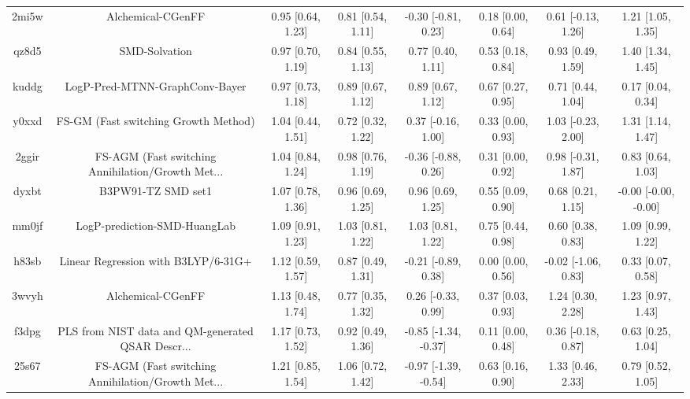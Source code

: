\documentclass{article}
\begin{document}
\begin{center}
\begin{longtable}{|cccccccc|}
 2mi5w &                                  Alchemical-CGenFF &  0.95 [0.64, 1.23] &  0.81 [0.54, 1.11] &   -0.30 [-0.81, 0.23] &  0.18 [0.00, 0.64] &   0.61 [-0.13, 1.26] &     1.21 [1.05, 1.35] \\
 qz8d5 &                                      SMD-Solvation &  0.97 [0.70, 1.19] &  0.84 [0.55, 1.13] &     0.77 [0.40, 1.11] &  0.53 [0.18, 0.84] &    0.93 [0.49, 1.59] &     1.40 [1.34, 1.45] \\
 kuddg &                     LogP-Pred-MTNN-GraphConv-Bayer &  0.97 [0.73, 1.18] &  0.89 [0.67, 1.12] &     0.89 [0.67, 1.12] &  0.67 [0.27, 0.95] &    0.71 [0.44, 1.04] &     0.17 [0.04, 0.34] \\
 y0xxd &               FS-GM (Fast switching Growth Method) &  1.04 [0.44, 1.51] &  0.72 [0.32, 1.22] &    0.37 [-0.16, 1.00] &  0.33 [0.00, 0.93] &   1.03 [-0.23, 2.00] &     1.31 [1.14, 1.47] \\
 2ggir &  FS-AGM (Fast switching Annihilation/Growth Met... &  1.04 [0.84, 1.24] &  0.98 [0.76, 1.19] &   -0.36 [-0.88, 0.26] &  0.31 [0.00, 0.92] &   0.98 [-0.31, 1.87] &     0.83 [0.64, 1.03] \\
 dyxbt &                                 B3PW91-TZ SMD set1 &  1.07 [0.78, 1.36] &  0.96 [0.69, 1.25] &     0.96 [0.69, 1.25] &  0.55 [0.09, 0.90] &    0.68 [0.21, 1.15] &  -0.00 [-0.00, -0.00] \\
 mm0jf &                       LogP-prediction-SMD-HuangLab &  1.09 [0.91, 1.23] &  1.03 [0.81, 1.22] &     1.03 [0.81, 1.22] &  0.75 [0.44, 0.98] &    0.60 [0.38, 0.83] &     1.09 [0.99, 1.22] \\
 h83sb &                Linear Regression with B3LYP/6-31G+ &  1.12 [0.59, 1.57] &  0.87 [0.49, 1.31] &   -0.21 [-0.89, 0.38] &  0.00 [0.00, 0.56] &  -0.02 [-1.06, 0.83] &     0.33 [0.07, 0.58] \\
 3wvyh &                                  Alchemical-CGenFF &  1.13 [0.48, 1.74] &  0.77 [0.35, 1.32] &    0.26 [-0.33, 0.99] &  0.37 [0.03, 0.93] &    1.24 [0.30, 2.28] &     1.23 [0.97, 1.43] \\
 f3dpg &  PLS from NIST data and QM-generated QSAR Descr... &  1.17 [0.73, 1.52] &  0.92 [0.49, 1.36] &  -0.85 [-1.34, -0.37] &  0.11 [0.00, 0.48] &   0.36 [-0.18, 0.87] &     0.63 [0.25, 1.04] \\
 25s67 &  FS-AGM (Fast switching Annihilation/Growth Met... &  1.21 [0.85, 1.54] &  1.06 [0.72, 1.42] &  -0.97 [-1.39, -0.54] &  0.63 [0.16, 0.90] &    1.33 [0.46, 2.33] &     0.79 [0.52, 1.05] \\

\end{longtable}
\end{center}
\end{document}
